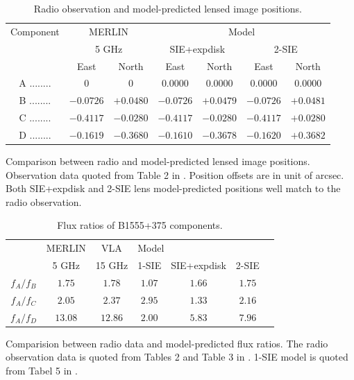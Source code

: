 \documentclass[useAMS,usenatbib]{mn2e}
\begin{document}
\begin{table}
 \begin{minipage}{140mm}
  \caption{Radio observation and model-predicted lensed image positions.}
  \begin{tabular}{@{}ccccccc}

\hline

Component	&\multicolumn{2}{c}{MERLIN} 	 & \multicolumn{4}{c}{Model} \\
					&\multicolumn{2}{c}{5 GHz}		&	\multicolumn{2}{c}{SIE+expdisk} &\multicolumn{2}{c}{ 2-SIE}		\\
					 &East &North &East 		&North &East 		&North\\ 
\hline
A ........ &$0$    		&$0$		&$0.0000$ &$0.0000$   &   $0.0000$   &  $ 0.0000$\\  
B ........ &$-0.0726$ 	&$+0.0480$	&$-0.0726$ &$+0.0479$ & $-0.0726 $  &  $+0.0481$  \\  
C ........ &$-0.4117$  &$-0.0280$	&$-0.4117$ &$-0.0280$  & $-0.4117 $  &   $+0.0280$ \\  
D ........ &$-0.1619$  &$-0.3680$	&$-0.1610$ &$-0.3678$  & $-0.1620$    &  $+0.3682$ \\  
\hline
\end{tabular}

\end{minipage}
\medskip

Comparison between radio and model-predicted lensed image positions. Observation data quoted from Table 2 in \citet{Marlow99}. Position offsets are in unit of arcsec. Both SIE+expdisk and 2-SIE lens model-predicted positions well match to the radio observation.

\end{table}

\begin{table}
  \caption{Flux ratios of B1555+375 components.}
  \begin{tabular}{@{}ccccccc}

\hline
	& MERLIN & VLA & \multicolumn{3}{l}{Model}\\
		&5 GHz & 15 GHz  & 1-SIE & SIE+expdisk & 2-SIE\\
\hline
$f_A/f_B$			&$1.75$ & $1.78$ &$1.07$& $1.66$ & $1.75$ \\ 
$f_A/f_C$		&$2.05$ 	&$2.37$ &$2.95$ & $1.33$ & $2.16$\\
$f_A/f_D$		&$13.08$ &$ 12.86$ &$2.00$& $5.83$ & $7.96$\\

\hline
\end{tabular}

\medskip
Comparision between radio data and model-predicted flux ratios. The radio observation data is quoted from Tables 2 and Table 3 in \citet{Marlow99}. 1-SIE model is quoted from Tabel 5 in \citet{Marlow99}.

\end{table}
\end{document}
